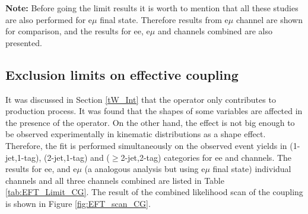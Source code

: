 \textbf{Note:} Before going the limit results it is worth to mention that all these studies are also performed for e$\mu$ final state. Therefore results from e$\mu$ channel are shown for comparison, and the results for ee, e$\mu$ and \mumu channels combined are also presented.


\subsection {Exclusion limits on \texorpdfstring{\CG effective coupling}{}}

It was discussed in Section \ref{tW_Int} that the operator \OG only contributes to \ttbar production process.
It was found that the shapes of some variables are affected in the presence of the \OG operator.
On the other hand, the effect is not  big enough to be observed experimentally in \ttbar kinematic distributions as a shape effect.
Therefore, the fit is  performed simultaneously on the observed event yields in (1-jet,1-tag), (2-jet,1-tag) and ($\geq$2-jet,2-tag) categories for ee and \mumu channels.
The results for ee, \mumu and e$\mu$ (a analogous analysis but using e$\mu$ final state) individual channels and all three channels combined are listed in Table \ref{tab:EFT_Limit_CG}.
The result of the combined likelihood scan of the \CG coupling is shown in Figure \ref{fig:EFT_scan_CG}.


\begin{table}[h]
\centering
{}
\caption{Summary of allowed 68\% CL and 95\% CL intervals on \CG effective coupling  obtained in ee, e$\mu$, \mumu and combined channels ($\Lambda = 1$ TeV).}
\label{tab:EFT_Limit_CG}
\end{table}

